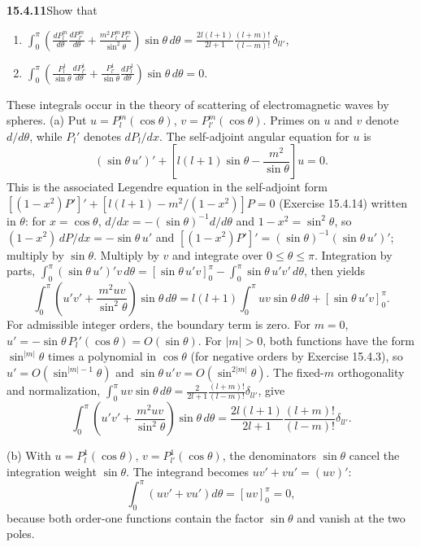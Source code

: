 \par\bigskip
\noindent\textbf{15.4.11}\quad Show that 
\begin{enumerate}
\item[(a)] $\displaystyle\int_{0}^{\pi}
\left(\frac{dP_{l}^{m}}{d\theta}\frac{dP_{l'}^{m}}{d\theta}
+\frac{m^{2}P_{l}^{m}P_{l'}^{m}}{\sin^{2}\theta}\right)
\sin\theta\,d\theta
=\frac{2l(l+1)}{2l+1}\frac{(l+m)!}{(l-m)!}\,\delta_{ll'}$,
\item[(b)] $\displaystyle\int_{0}^{\pi}
\left(\frac{P_{l}^{1}}{\sin\theta}\frac{dP_{l'}^{1}}{d\theta}
+\frac{P_{l'}^{1}}{\sin\theta}\frac{dP_{l}^{1}}{d\theta}\right)
\sin\theta\,d\theta=0$.
\end{enumerate}
These integrals occur in the theory of scattering of electromagnetic
waves by spheres.
\solution
(a) Put $u=P_l^m(\cos\theta)$, $v=P_{l'}^m(\cos\theta)$.
Primes on $u$ and $v$ denote $d/d\theta$, while $P_l'$ denotes
$dP_l/dx$. The self-adjoint angular equation for $u$ is
\[
(\sin\theta\,u')'
+\left[l(l+1)\sin\theta-\frac{m^2}{\sin\theta}\right]u=0.
\]
This is the associated Legendre equation in the self-adjoint form
$[(1-x^2)P']'+[l(l+1)-m^2/(1-x^2)]P=0$ (Exercise 15.4.14) written in
$\theta$: for $x=\cos\theta$, $d/dx=-(\sin\theta)^{-1}d/d\theta$ and
$1-x^2=\sin^2\theta$, so $(1-x^2)\,dP/dx=-\sin\theta\,u'$ and
$[(1-x^2)P']'=(\sin\theta)^{-1}(\sin\theta\,u')'$; multiply by
$\sin\theta$.
Multiply by $v$ and integrate over $0\le\theta\le\pi$. Integration by
parts, $\int_0^\pi(\sin\theta\,u')'v\,d\theta
=[\sin\theta\,u'v]_0^\pi-\int_0^\pi\sin\theta\,u'v'\,d\theta$, then
yields
\[
\int_0^\pi\left(u'v'+\frac{m^2uv}{\sin^2\theta}\right)\sin\theta\,d\theta
=l(l+1)\int_0^\pi uv\sin\theta\,d\theta
+[\sin\theta\,u'v]_0^\pi.
\]
For admissible integer orders, the boundary term is zero.
For $m=0$, $u'=-\sin\theta\,P_l'(\cos\theta)=O(\sin\theta)$. For
$|m|>0$, both functions have the form $\sin^{|m|}\theta$ times a
polynomial in $\cos\theta$ (for negative orders by
Exercise 15.4.3), so $u'=O(\sin^{|m|-1}\theta)$ and
$\sin\theta\,u'v=O(\sin^{2|m|}\theta)$.
The fixed-$m$ orthogonality and normalization,
$\int_0^\pi uv\sin\theta\,d\theta
=\frac2{2l+1}\frac{(l+m)!}{(l-m)!}\delta_{ll'}$, give
\[
\boxed{\int_0^\pi\left(u'v'+\frac{m^2uv}{\sin^2\theta}\right)
\sin\theta\,d\theta
=\frac{2l(l+1)}{2l+1}\frac{(l+m)!}{(l-m)!}\delta_{ll'}}.
\]

(b) With $u=P_l^1(\cos\theta)$, $v=P_{l'}^1(\cos\theta)$, the
denominators $\sin\theta$ cancel the integration weight $\sin\theta$.
The integrand becomes $uv'+vu'=(uv)'$:
\[
\int_0^\pi(uv'+vu')d\theta=[uv]_0^\pi=0,
\]
because both order-one functions contain the factor $\sin\theta$ and
vanish at the two poles.

